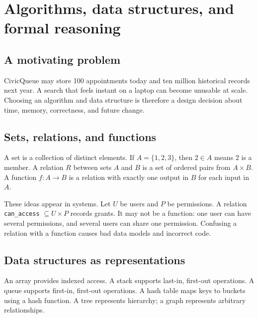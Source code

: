 \chapter{Algorithms, data structures, and formal reasoning}
\label{ch:algorithms}

\section{A motivating problem}
CivicQueue may store 100 appointments today and ten million historical records next year. A search that feels instant on a laptop can become unusable at scale. Choosing an algorithm and data structure is therefore a design decision about time, memory, correctness, and future change.


\section{Sets, relations, and functions}
A set is a collection of distinct elements. If $A=\{1,2,3\}$, then $2\in A$ means 2 is a member. A relation $R$ between sets $A$ and $B$ is a set of ordered pairs from $A\times B$. A function $f:A\to B$ is a relation with exactly one output in $B$ for each input in $A$.

These ideas appear in systems. Let $U$ be users and $P$ be permissions. A relation \texttt{can\_access} \(\subseteq U\times P\) records grants. It may not be a function: one user can have several permissions, and several users can share one permission. Confusing a relation with a function causes bad data models and incorrect code.

\section{Data structures as representations}
An array provides indexed access. A stack supports last-in, first-out operations. A queue supports first-in, first-out operations. A hash table maps keys to buckets using a hash function. A tree represents hierarchy; a graph represents arbitrary relationships.

